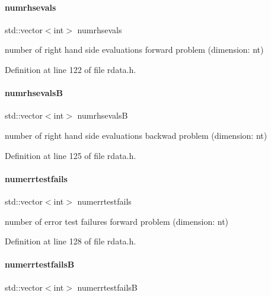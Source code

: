 \paragraph{\texorpdfstring{numrhsevals}{numrhsevals}}
{\footnotesize\ttfamily std\+::vector$<$int$>$ numrhsevals}

number of right hand side evaluations forward problem (dimension\+: nt) 

Definition at line 122 of file rdata.\+h.

\mbox{\label{classamici_1_1_return_data_aa0eda2ffc8979d9e46d8fb2d8d3a1622}} 
\paragraph{\texorpdfstring{numrhsevalsB}{numrhsevalsB}}
{\footnotesize\ttfamily std\+::vector$<$int$>$ numrhsevalsB}

number of right hand side evaluations backwad problem (dimension\+: nt) 

Definition at line 125 of file rdata.\+h.

\mbox{\label{classamici_1_1_return_data_aea0bfe23fb5971a5348a3d017a859488}} 
\paragraph{\texorpdfstring{numerrtestfails}{numerrtestfails}}
{\footnotesize\ttfamily std\+::vector$<$int$>$ numerrtestfails}

number of error test failures forward problem (dimension\+: nt) 

Definition at line 128 of file rdata.\+h.

\mbox{\label{classamici_1_1_return_data_a894f4cf4dbdd38dda12c5730fb04482d}} 
\paragraph{\texorpdfstring{numerrtestfailsB}{numerrtestfailsB}}
{\footnotesize\ttfamily std\+::vector$<$int$>$ numerrtestfailsB}

